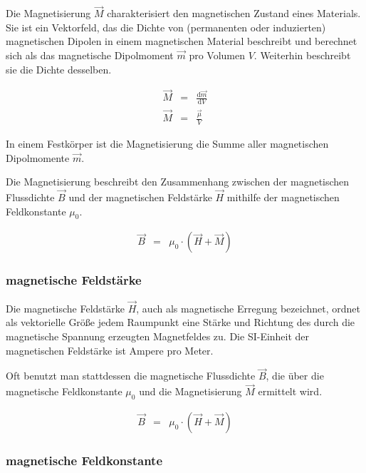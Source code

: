 \documentclass[12pt,a4paper]{scrartcl}
\numberwithin{equation}{section} %
\renewcommand{\[}{} %
\renewcommand{\]}{\noindent} %
\begin{document}
Die Magnetisierung \(\vec M\) charakterisiert den magnetischen Zustand
eines Materials. Sie ist ein Vektorfeld, das die Dichte von (permanenten
oder induzierten) magnetischen Dipolen in einem magnetischen Material
beschreibt und berechnet sich als das magnetische Dipolmoment \(\vec m\)
pro Volumen \(V\). Weiterhin beschreibt sie die Dichte desselben.

\[
\begin{eqnarray}
    \vec M &=& \frac{\mathrm d\vec m}{\mathrm dV} \\
    \vec M &=& \frac{\vec \mu}{V}
\end{eqnarray}
\]

In einem Festkörper ist die Magnetisierung die Summe aller magnetischen
Dipolmomente \(\vec m\).

Die Magnetisierung beschreibt den Zusammenhang zwischen der magnetischen
Flussdichte \(\vec B\) und der magnetischen Feldstärke \(\vec H\)
mithilfe der magnetischen Feldkonstante \(\mu_0\).

\[
\begin{eqnarray}
 \vec B &=& \mu_0 \cdot \left(\vec H + \vec M\right)
\end{eqnarray}
\]

\hypertarget{magnetische-feldstuxe4rke}{%
\subsubsection{magnetische Feldstärke}\label{magnetische-feldstuxe4rke}}

Die magnetische Feldstärke \(\vec H\), auch als magnetische Erregung
bezeichnet, ordnet als vektorielle Größe jedem Raumpunkt eine Stärke und
Richtung des durch die magnetische Spannung erzeugten Magnetfeldes zu.
Die SI-Einheit der magnetischen Feldstärke ist Ampere pro Meter.

Oft benutzt man stattdessen die magnetische Flussdichte \(\vec B\), die
über die magnetische Feldkonstante \(\mu_0\) und die Magnetisierung
\(\vec M\) ermittelt wird.

\[
\begin{eqnarray}
    \vec B &=& \mu_0 \cdot \left(\vec H + \vec M\right)
\end{eqnarray}
\]

\hypertarget{magnetische-feldkonstante}{%
\subsubsection{magnetische
Feldkonstante}\label{magnetische-feldkonstante}}
\end{document}
